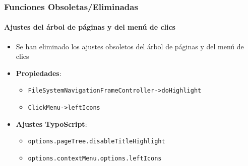 
\begin{frame}[fragile]
	\frametitle{Funciones Obsoletas/Eliminadas}
	\framesubtitle{Ajustes del árbol de páginas y del menú de clics}

	\begin{itemize}

		\item Se han eliminado los ajustes obsoletos del árbol de páginas y del menú de clics
		\item \textbf{Propiedades}:

		\begin{itemize}
			\item \texttt{FileSystemNavigationFrameController->doHighlight}
			\item \texttt{ClickMenu->leftIcons}
		\end{itemize}

		\item \textbf{Ajustes TypoScript}:

		\begin{itemize}
			\item \texttt{options.pageTree.disableTitleHighlight}
			\item \texttt{options.contextMenu.options.leftIcons}
		\end{itemize}

	\end{itemize}

\end{frame}



